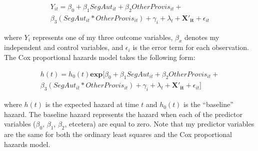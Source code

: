 \documentclass[12pt]{article}
\begin{document}
\begin{equation}
\begin{gathered}
Y_{it} = \beta_0 + \beta_1 SegAut_{it} + \beta_2 OtherProvis_{it} + \\ \beta_3 (SegAut_{it} * OtherProvis_{it})  + \gamma_i + \lambda_t + \mathbf{X'_{it}} + \epsilon_{it}
\end{gathered}
\end{equation}

where $Y_i$ represents one of my three outcome variables, $\beta_x$ denotes my independent and control variables, and $\epsilon_i$ is the error term for each observation. The Cox proportional hazards model takes the following form: 

\begin{equation}
\begin{gathered}
h(t) = h_0 (t)\mathbf{exp}[\beta_0 + \beta_1 SegAut_{it} + \beta_2 OtherProvis_{it} + \\ \beta_3 (SegAut_{it} * OtherProvis_{it})  + \gamma_i + \lambda_t + \mathbf{X'_{it}} + \epsilon_{it}]
\end{gathered}
\end{equation}

where $h(t)$ is the expected hazard at time $t$ and $h_0 (t)$ is the ``baseline'' hazard. The baseline hazard represents the hazard when each of the predictor variables ($\beta_0$, $\beta_1$, $\beta_2$, etcetera) are equal to zero. Note that my predictor variables are the same for both the ordinary least squares and the Cox proportional hazards model. 
\end{document}
